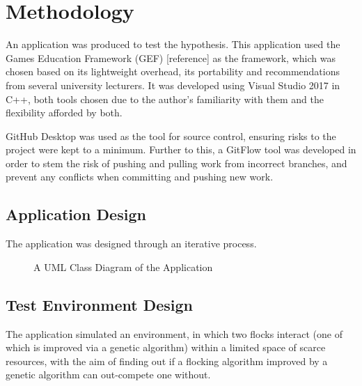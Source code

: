 
\section{Methodology}
An application was produced to test the hypothesis. This application used the Games Education Framework (GEF) [reference] as the framework, which was chosen based on its lightweight overhead, its portability and recommendations from several university lecturers. It was developed using Visual Studio 2017 in C++, both tools chosen due to the author's familiarity with them and the flexibility afforded by both.

GitHub Desktop was used as the tool for source control, ensuring risks to the project were kept to a minimum. Further to this, a GitFlow tool was developed in order to stem the risk of pushing and pulling work from incorrect branches, and prevent any conflicts when committing and pushing new work.

\subsection{Application Design}
The application was designed through an iterative process. 

\begin{figure}
	\caption{A UML Class Diagram of the Application}
	\label{fig:classdiagram}
\end{figure}

\subsection{Test Environment Design}
The application simulated an environment, in which two flocks interact (one of which is improved via a genetic algorithm) within a limited space of scarce resources, with the aim of finding out if a flocking algorithm improved by a genetic algorithm can out-compete one without.

